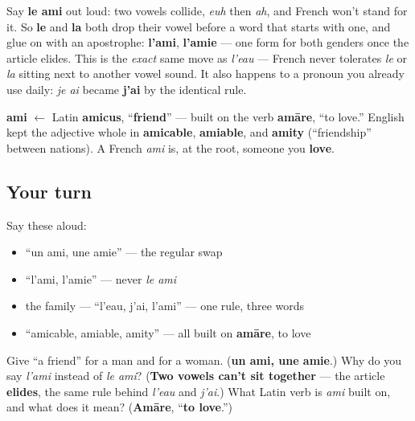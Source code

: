 \begin{grammarlens}[title={Grammar Lens: why it's l'ami, not le ami}]
Say \textbf{le ami} out loud: two vowels collide, \emph{euh} then \emph{ah}, and French won't stand for it. So \textbf{le} and \textbf{la} both drop their vowel before a word that starts with one, and glue on with an apostrophe: \textbf{l'ami}, \textbf{l'amie} — one form for both genders once the article elides. This is the \emph{exact} same move as \emph{l'eau} — French never tolerates \emph{le} or \emph{la} sitting next to another vowel sound. It also happens to a pronoun you already use daily: \emph{je ai} became \textbf{j'ai} by the identical rule.
\end{grammarlens}

\begin{cousinweb}
\textbf{ami} $\leftarrow$ Latin \textbf{amicus}, \textquotedblleft{}\textbf{friend}\textquotedblright{} — built on the verb \textbf{amāre}, \textquotedblleft{}to love.\textquotedblright{} English kept the adjective whole in \textbf{amicable}, \textbf{amiable}, and \textbf{amity} (\textquotedblleft{}friendship\textquotedblright{} between nations). A French \emph{ami} is, at the root, someone you \textbf{love}.
\end{cousinweb}

\subsection*{Your turn}
Say these aloud:

\begin{itemize}
\raggedright
  \item \textquotedblleft{}un ami, une amie\textquotedblright{} — the regular swap
  \item \textquotedblleft{}l'ami, l'amie\textquotedblright{} — never \emph{le ami}
  \item the family — \textquotedblleft{}l'eau, j'ai, l'ami\textquotedblright{} — one rule, three words
  \item \textquotedblleft{}amicable, amiable, amity\textquotedblright{} — all built on \textbf{amāre}, to love
\end{itemize}

\begin{tcolorbox}[breakable,colback=teal!4,colframe=teal!35!black,title={Before you move on}]
Give \textquotedblleft{}a friend\textquotedblright{} for a man and for a woman. (\textbf{un ami, une amie}.) Why do you say \emph{l'ami} instead of \emph{le ami}? (\textbf{Two vowels can't sit together} — the article \textbf{elides}, the same rule behind \emph{l'eau} and \emph{j'ai}.) What Latin verb is \emph{ami} built on, and what does it mean? (\textbf{Amāre}, \textquotedblleft{}\textbf{to love}.\textquotedblright{})
\end{tcolorbox}
